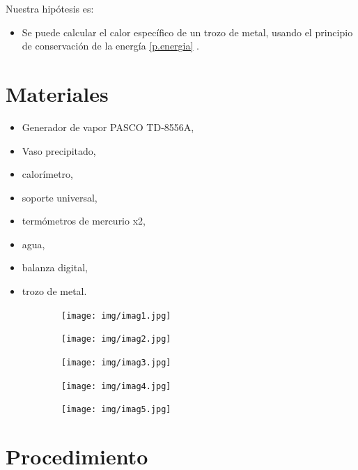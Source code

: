 \documentclass[a4paper, 12p]{article}
\begin{document}
Nuestra hipótesis es:
\begin{itemize}
      \item Se puede calcular el calor específico de un trozo de metal, usando el principio de conservación de la energía \eqref{p.energia} .
\end{itemize}


\section{Materiales}


\begin{itemize}
      \item Generador de vapor PASCO TD-8556A,
      \item Vaso precipitado,
      \item calorímetro,
       \item soporte universal,
      \item termómetros de mercurio x2,
      \item agua,
      \item balanza digital,
      \item trozo de metal.
\end{itemize}



\begin{figure}[H]
    \begin{subfigure}
          \raggedleft
          \texttt{[image: img/imag1.jpg]}
    \end{subfigure}
    \begin{subfigure}
          \raggedleft
          \texttt{[image: img/imag2.jpg]}
    \end{subfigure}
    \begin{subfigure}
          \raggedleft
          \texttt{[image: img/imag3.jpg]}   
    \end{subfigure}   
    \begin{subfigure}
          \raggedleft
          \texttt{[image: img/imag4.jpg]} 
    \end{subfigure}
    \begin{subfigure}
          \raggedleft
          \texttt{[image: img/imag5.jpg]} 
    \end{subfigure}
\end{figure}     


\section{Procedimiento}
\end{document}
